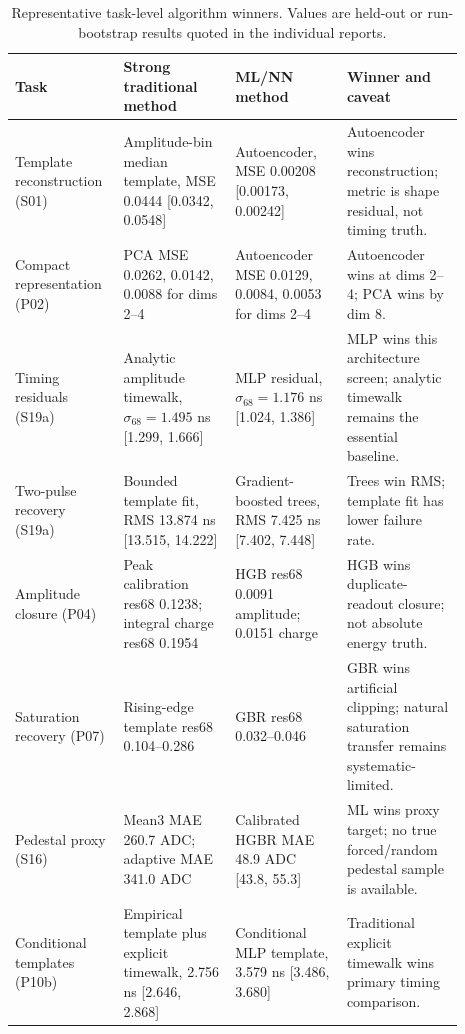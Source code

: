 \begin{table}[H]
\centering
\caption{Representative task-level algorithm winners. Values are held-out or run-bootstrap results quoted in the individual reports.}
\label{tab:task-winners}
\begin{tabular}{p{0.19\linewidth}p{0.23\linewidth}p{0.23\linewidth}p{0.24\linewidth}}
\toprule
Task & Strong traditional method & ML/NN method & Winner and caveat \\
\midrule
Template reconstruction (S01) &
Amplitude-bin median template, MSE 0.0444 [0.0342, 0.0548] &
Autoencoder, MSE 0.00208 [0.00173, 0.00242] &
Autoencoder wins reconstruction; metric is shape residual, not timing truth. \\
\addlinespace
Compact representation (P02) &
PCA MSE 0.0262, 0.0142, 0.0088 for dims 2--4 &
Autoencoder MSE 0.0129, 0.0084, 0.0053 for dims 2--4 &
Autoencoder wins at dims 2--4; PCA wins by dim 8. \\
\addlinespace
Timing residuals (S19a) &
Analytic amplitude timewalk, \(\sigma_{68}=1.495\) ns [1.299, 1.666] &
MLP residual, \(\sigma_{68}=1.176\) ns [1.024, 1.386] &
MLP wins this architecture screen; analytic timewalk remains the essential baseline. \\
\addlinespace
Two-pulse recovery (S19a) &
Bounded template fit, RMS 13.874 ns [13.515, 14.222] &
Gradient-boosted trees, RMS 7.425 ns [7.402, 7.448] &
Trees win RMS; template fit has lower failure rate. \\
\addlinespace
Amplitude closure (P04) &
Peak calibration res68 0.1238; integral charge res68 0.1954 &
HGB res68 0.0091 amplitude; 0.0151 charge &
HGB wins duplicate-readout closure; not absolute energy truth. \\
\addlinespace
Saturation recovery (P07) &
Rising-edge template res68 0.104--0.286 &
GBR res68 0.032--0.046 &
GBR wins artificial clipping; natural saturation transfer remains systematic-limited. \\
\addlinespace
Pedestal proxy (S16) &
Mean3 MAE 260.7 ADC; adaptive MAE 341.0 ADC &
Calibrated HGBR MAE 48.9 ADC [43.8, 55.3] &
ML wins proxy target; no true forced/random pedestal sample is available. \\
\addlinespace
Conditional templates (P10b) &
Empirical template plus explicit timewalk, 2.756 ns [2.646, 2.868] &
Conditional MLP template, 3.579 ns [3.486, 3.680] &
Traditional explicit timewalk wins primary timing comparison. \\
\bottomrule
\end{tabular}
\end{table}

